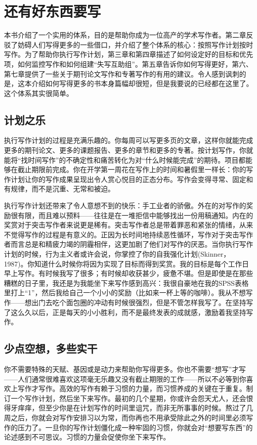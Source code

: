 \chapter{还有好东西要写}
本书介绍了一个实用的体系，目的是帮助你成为一位高产的学术写作者。第二章反驳了妨碍人们写得更多的一些借口，并介绍了整个体系的核心：按照写作计划按时写作。为了帮助你执行写作计划，第三章和第四章描述了如何设定好的目标和优先项，如何监控写作和如何组建“失写互助组”。第五章告诉你如何写得更好，第六、第七章提供了一些关于期刊论文写作和专著写作的有用的建议。令人感到讽刺的是，这本介绍如何写得更多的书本身篇幅却很短，但是我要说的已经都在这里了。这个体系其实很简单。

\section{计划之乐}
执行写作计划的过程是充满乐趣的。你每周可以写更多页的文章，这样你就能完成更多的期刊论文、更多的课题报告、更多的章节和更多的专著。按计划写作，你就能将“找时间写作”的不确定性和痛苦转化为对“什么时候能完成”的期待。项目都能够在截止期限前完成。你在开学第一周花在写作上的时间和暑假里一样长：你的写作计划让你的写作成果呈现出令人赏心悦目的正态分布。写作会变得寻常、固定和有规律，而不是沉重、无常和被迫。

执行写作计划还带来了令人意想不到的快乐：手工业者的骄傲。外在的对写作的奖励很有限，而且难以预料——往往是在一堆拒信中能够找出一份用稿通知。内在的奖赏对于突击写作者来说更是稀有。突击写作者总是带着罪恶和紧张的情绪，从来不觉得写作的过程是有意义的。正因为长时间地持续恶性循环，写作对于突击写作者而言总是和精疲力竭的阴霾相伴，这更加剧了他们对写作的厌恶。当你执行写作计划的时候，行为主义者或许会说，你掌控了你的自我强化计划(Skinner， 1987)。你知道什么时候你将因为实现了目标而得到奖赏。我的目标是每个工作日早上写作。有时候我写了很多；有时候却收获甚少，疲惫不堪。但是即使是在那些糟糕的日子里，我还是为我能坐下来写作感到高兴：我很自豪地在我的SPSS表格里打上“1”，然后我给自己一个小小的奖励（比如来一杯上等的咖啡）。我从不想写作——想出门去吃个面包圈的冲动有时候很强烈，但是不管怎样我写了。在坚持写了这么久以后，正是每天的小小胜利，而不是最终发表的成就感，激励着我坚持写作。



\section{少点空想，多些实干}
你不需要特殊的天赋、基因或是动力来帮助你写得更多。你也不需要“想写”才写——人们通常很难喜欢这项毫无乐趣又没有截止期限的工作——所以不必等到你喜欢上写作才写作。高效的写作有赖于习惯的力量，而习惯养成的关键在于重复。制订一个写作计划，然后坐下来写作。最初的几个星期，你或许会怨天尤人，还会恨得牙痒痒，但至少你是在计划写作的时间里诅咒，而非无所事事的时候。熬过了几周之后，你就会对写作安排习以为常，而你再也不用承受除此之外的时间里必须写作的压力了。一旦你的写作计划僵化成一种牢固的习惯，你就会对“想要写东西”的论述感到不可思议。习惯的力量会促使你坐下来写作。

